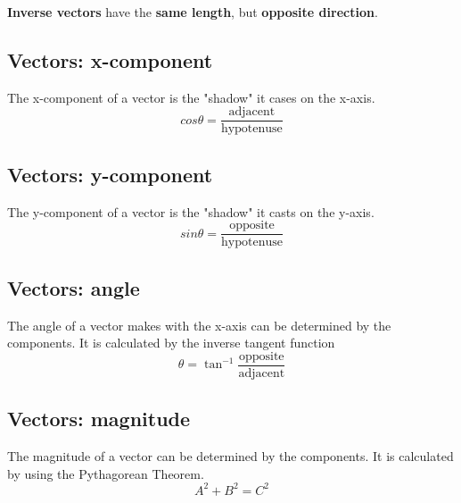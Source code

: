 \textbf{Inverse vectors} have the \textbf{same length}, but \textbf{opposite direction}.
	
\subsection{Vectors: x-component}
The x-component of a vector is the "shadow" it cases on the x-axis. 
\[cos \theta = \frac{\text{adjacent}}{\text{hypotenuse}}\]
	
\subsection{Vectors: y-component}
The y-component of a vector is the "shadow" it casts on the y-axis. 
\[sin\theta=\frac{\text{opposite}}{\text{hypotenuse}}\]
	
\subsection{Vectors: angle}
The angle of a vector makes with the x-axis can be determined by the components. It is calculated by the inverse tangent function
\[\theta = \tan^{-1}\frac{\text{opposite}}{\text{adjacent}}\]
	
\subsection{Vectors: magnitude}
The magnitude of a vector can be determined by the components. It is calculated by using the Pythagorean Theorem. \[A^2+B^2=C^2\]